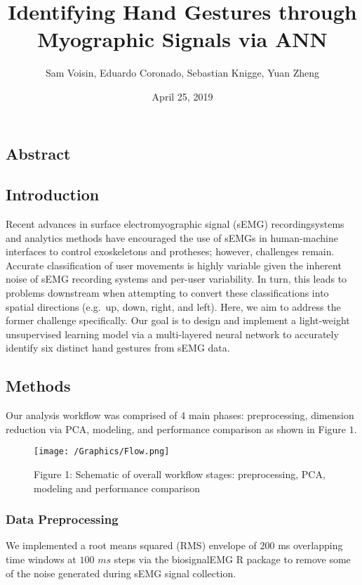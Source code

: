 \documentclass[]{article}
\title{Identifying Hand Gestures through Myographic Signals via ANN}
\author{Sam Voisin, Eduardo Coronado, Sebastian Knigge, Yuan Zheng}
\date{April 25, 2019}
\begin{document}
\maketitle

\subsection{Abstract}\label{abstract}

\subsection{Introduction}\label{introduction}

Recent advances in surface electromyographic signal (sEMG)
recordingsystems and analytics methods have encouraged the use of sEMGs
in human-machine interfaces to control exoskeletons and protheses;
however, challenges remain. Accurate classification of user movements is
highly variable given the inherent noise of sEMG recording systems and
per-user variability. In turn, this leads to problems downstream when
attempting to convert these classifications into spatial directions
(e.g.~up, down, right, and left). Here, we aim to address the former
challenge specifically. Our goal is to design and implement a
light-weight unsupervised learning model via a multi-layered neural
network to accurately identify six distinct hand gestures from sEMG
data.

\subsection{Methods}\label{methods}

Our analysis workflow was comprised of 4 main phases: preprocessing,
dimension reduction via PCA, modeling, and performance comparison as
shown in Figure \(1\).

\begin{figure}
\centering
\texttt{[image: /Graphics/Flow.png]}
\caption{Figure 1: Schematic of overall workflow stages: preprocessing,
PCA, modeling and performance comparison}
\end{figure}

\subsubsection{Data Preprocessing}\label{data-preprocessing}

We implemented a root means squared (RMS) envelope of \(200\) ms
overlapping time windows at \(100\) \(ms\) steps via the biosignalEMG R
package to remove some of the noise generated during sEMG signal
collection.
\end{document}
